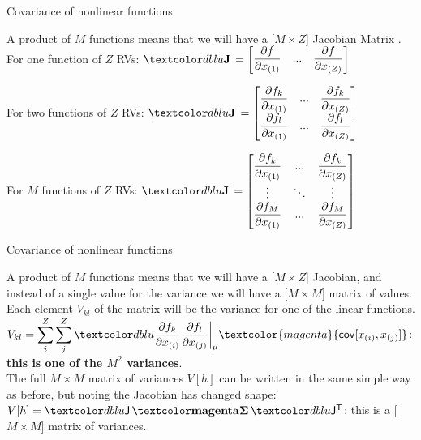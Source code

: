 \documentclass[10pt,sans,english,compress,xcolor=dvipsnames]{beamer}
\begin{document}
\begin{frame}{Covariance of nonlinear functions}
\footnotesize

A product of $M$ functions means that we will have a [$M\times Z$] Jacobian Matrix .\\

For one function of $Z$ RVs: $
 \blu{\mathbf{J}}\, = 
\begin{bmatrix}
\dfrac{\partial {f}}{\partial x_{(1)}}& ... & \dfrac{\partial {f}}{\partial x_{(Z)}} \\
\end{bmatrix}
$
\vspace{0.5cm}

For two functions of $Z$ RVs: $
 \blu{\mathbf{J}}\, = 
\begin{bmatrix}
\dfrac{\partial {f_k}}{\partial x_{(1)}}& ... & \dfrac{\partial {f_k}}{\partial x_{(Z)}}\\[0.5ex]
\dfrac{\partial {f_l}}{\partial x_{(1)}}& ... & \dfrac{\partial {f_l}}{\partial x_{(Z)}} \\
\end{bmatrix}
$
\vspace{0.5cm}

For $M$ functions of $Z$ RVs: $
 \blu{\mathbf{J}}\, = 
\begin{bmatrix}
\dfrac{\partial {f_k}}{\partial x_{(1)}}& ... & \dfrac{\partial {f_k}}{\partial x_{(Z)}}\\
\vdots & \ddots & \vdots\\
\dfrac{\partial {f_M}}{\partial x_{(1)}}& ... & \dfrac{\partial {f_M}}{\partial x_{(Z)}} \\
\end{bmatrix}
$
\end{frame} 


\begin{frame}{Covariance of nonlinear functions}
\footnotesize

A product of $M$ functions means that we will have a [$M\times Z$] Jacobian, and instead of a single value for the variance we will have a [$M\times M$] matrix of values. Each element $V_{kl}$ of the matrix will be the variance for one of the linear functions.\\[2ex]

$V_{kl} =  \displaystyle \sum\limits_i^Z  \sum\limits_j^Z \blu{\dfrac{\partial f_k}{\partial x_{(i)}} \dfrac{\partial f_l}{\partial x_{(j)}}  \bigg|_{\mu}} \textcolor{magenta}{\mathsf{cov}[x_{(i)}, x_{(j)}]}$: \textbf{this is one of the $M^2$ variances}. \\[2ex]

The full $M\times M$ matrix of variances $V[h]$ can be written in the same simple way as before, but noting the Jacobian  has changed shape:\\[1ex]
$V[h] =  \blu{\mathsf{J}}\, \covmat\, \blu{\mathsf{J^{T}}} $: this is a [$M\times M$] matrix of variances.\\[1ex]


\end{frame} 
\end{document}
